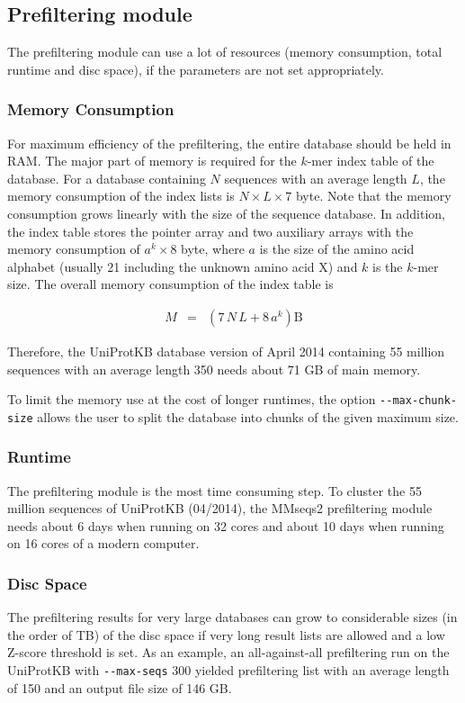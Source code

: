 \documentclass[11pt,a4paper]{scrreprt}
\begin{document}
\subsection{Prefiltering module}
The prefiltering module can use a lot of resources (memory consumption, total runtime and disc space), if the parameters are not set appropriately.
\subsubsection{Memory Consumption}
For maximum efficiency of the prefiltering, the entire database should be held in RAM. The major part of memory is required for the $k$-mer index table of the database. For a database containing $N$ sequences with an average length $L$, the memory consumption of the index lists is $N\times L\times7$ byte. Note that the memory consumption grows linearly with the size of the sequence database. In addition, the index table stores the pointer array and two auxiliary arrays with the memory consumption of $a^{k}\times8$ byte, where $a$ is the size of the amino acid alphabet (usually 21 including the unknown amino acid X) and $k$ is the $k$-mer size. The overall memory consumption of the index table is

\begin{eqnarray*}
M & = & (7\, N\, L+8\, a^{k})\mathrm{B}
\end{eqnarray*}

Therefore, the UniProtKB database version of April 2014 containing 55 million sequences with an average length 350 needs about 71 GB of main memory. 

To limit the memory use at the cost of longer runtimes, the option \texttt{-{}-max-chunk-size} allows the user to split the database into chunks of the given maximum size. 
\subsubsection{Runtime}
The prefiltering module is the most time consuming step. To cluster the 55 million sequences of UniProtKB (04/2014), the MMseqs2 prefiltering module needs about 6 days when running on 32 cores and about 10 days when running on 16 cores of a modern computer.
\subsubsection{Disc Space}
The prefiltering results for very large databases can grow to considerable sizes (in the order of TB) of the disc space if very long result lists are allowed and a low Z-score threshold is set. As an example, an all-against-all prefiltering run on the UniProtKB with \texttt{-{}-max-seqs} 300 yielded prefiltering list with an average length of 150 and an output file size of 146 GB.
\end{document}
